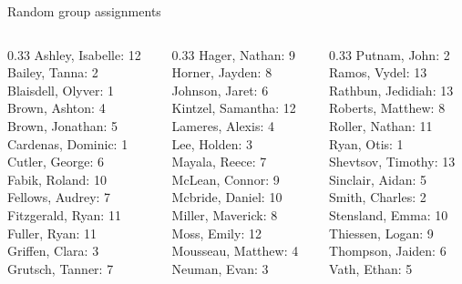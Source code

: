 \documentclass[10pt]{beamer}
\begin{document}
\begin{frame}{Random group assignments}
\begin{columns}
\begin{column}{0.33\textwidth}
Ashley, Isabelle: 12 \\ 
Bailey, Tanna: 2 \\ 
Blaisdell, Olyver: 1 \\ 
Brown, Ashton: 4 \\ 
Brown, Jonathan: 5 \\ 
Cardenas, Dominic: 1 \\ 
Cutler, George: 6 \\ 
Fabik, Roland: 10 \\ 
Fellows, Audrey: 7 \\ 
Fitzgerald, Ryan: 11 \\ 
Fuller, Ryan: 11 \\ 
Griffen, Clara: 3 \\ 
Grutsch, Tanner: 7 \\\end{column}
\begin{column}{0.33\textwidth}
Hager, Nathan: 9 \\ 
Horner, Jayden: 8 \\ 
Johnson, Jaret: 6 \\ 
Kintzel, Samantha: 12 \\ 
Lameres, Alexis: 4 \\ 
Lee, Holden: 3 \\ 
Mayala, Reece: 7 \\ 
McLean, Connor: 9 \\ 
Mcbride, Daniel: 10 \\ 
Miller, Maverick: 8 \\ 
Moss, Emily: 12 \\ 
Mousseau, Matthew: 4 \\ 
Neuman, Evan: 3 \\\end{column}
\begin{column}{0.33\textwidth}
Putnam, John: 2 \\ 
Ramos, Vydel: 13 \\ 
Rathbun, Jedidiah: 13 \\ 
Roberts, Matthew: 8 \\ 
Roller, Nathan: 11 \\ 
Ryan, Otis: 1 \\ 
Shevtsov, Timothy: 13 \\ 
Sinclair, Aidan: 5 \\ 
Smith, Charles: 2 \\ 
Stensland, Emma: 10 \\ 
Thiessen, Logan: 9 \\ 
Thompson, Jaiden: 6 \\ 
Vath, Ethan: 5 \\\end{column}
\end{columns}
\end{frame}
\end{document}
